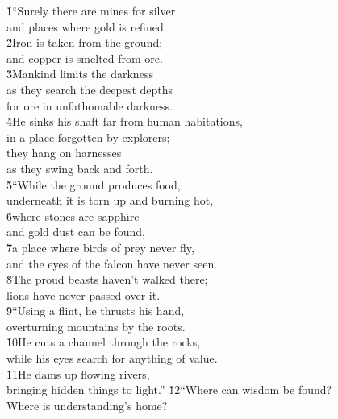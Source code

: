 \begin{poetry}
\poeml {}
\v{1}``Surely there are mines for silver \\
\poemll    and places where gold is refined. \\
\poeml \v{2}Iron is taken from the ground; \\
\poemll    and copper is smelted from ore. \\
\poeml \v{3}Mankind limits the darkness \\
\poemll    as they search the deepest depths \\
\poemlll       for ore in unfathomable darkness. \\
\poeml \v{4}He sinks his shaft far from human habitations, \\
\poemll    in a place forgotten by explorers; \\
\poeml they hang on harnesses \\
\poemll    as they swing back and forth. \\
\poeml \v{5}``While the ground produces food, \\
\poemll    underneath it is torn up and burning hot, \\
\poeml \v{6}where stones are sapphire \\
\poemll    and gold dust can be found, \\
\poeml \v{7}a place where birds of prey never fly, \\
\poemll    and the eyes of the falcon have never seen. \\
\poeml \v{8}The proud beasts haven't walked there; \\
\poemll    lions have never passed over it. \\
\poeml \v{9}``Using a flint, he thrusts his hand, \\
\poemll    overturning mountains by the roots. \\
\poeml \v{10}He cuts a channel through the rocks, \\
\poemll    while his eyes search for anything of value. \\
\poeml \v{11}He dams up flowing rivers, \\
\poemll    bringing hidden things to light.''
\poeml \v{12}``Where can wisdom be found? \\
\poemll    Where is understanding's home? \\

\end{poetry}
